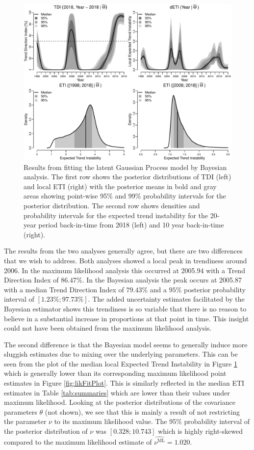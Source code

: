\documentclass[
  11pt,
]{article}
\theoremstyle{nonumberplain}
\begin{document}
\begin{figure}[htb]
\center\includegraphics{bayesFitPlot.pdf}
\caption{Results from fitting the latent Gaussian Process model by Bayesian analysis. The first row shows the posterior distributions of TDI (left) and local ETI (right) with the posterior means in bold and gray areas showing point-wise 95$\%$ and 99$\%$ probability intervals for the posterior distribution. The second row shows densities and probability intervals for the expected trend instability for the 20-year period back-in-time from 2018 (left) and 10 year back-in-time (right).}
\label{fig:bayesFitPlot}
\end{figure}

The results from the two analyses generally agree, but there are two
differences that we wish to address. Both analyses showed a local peak
in trendiness around 2006. In the maximum likelihood analysis this
occurred at 2005.94 with a Trend Direction Index of \(86.47\%\). In the
Bayesian analysis the peak occurs at 2005.87 with a median Trend
Direction Index of \(79.43\%\) and a \(95\%\) posterior probability
interval of \([1.23\%; 97.73\%]\). The added uncertainty estimates
facilitated by the Bayesian estimator shows this trendiness is so
variable that there is no reason to believe in a substantial increase in
proportions at that point in time. This insight could not have been
obtained from the maximum likelihood analysis.

The second difference is that the Bayesian model seems to generally
induce more sluggish estimates due to mixing over the underlying
parameters. This can be seen from the plot of the median local Expected
Trend Instability in Figure \ref{fig:bayesFitPlot} which is generally
lower than its corresponding maximum likelihood point estimates in
Figure \ref{fig:likFitPlot}. This is similarly reflected in the median
ETI estimates in Table \ref{tab:summaries} which are lower than their
values under maximum likelihood. Looking at the posterior distributions
of the covariance parameters \(\theta\) (not shown), we see that this is
mainly a result of not restricting the parameter \(\nu\) to its maximum
likelihood value. The 95\% probability interval of the posterior
distribution of \(\nu\) was \([0.328; 10.743]\) which is highly
right-skewed compared to the maximum likelihood estimate of
\(\widehat{\nu^\text{ML}} = 1.020\).
\end{document}

